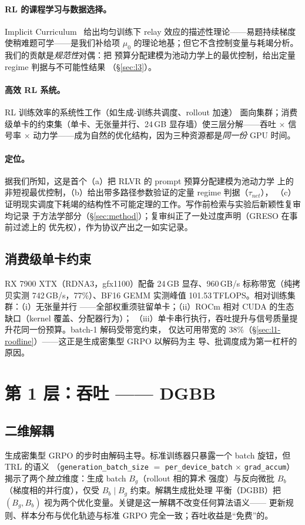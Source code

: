 \documentclass[11pt]{article}
\theoremstyle{definition}
\begin{document}
\paragraph{RL 的课程学习与数据选择。}Implicit Curriculum~\citep{huang2026implicit}
给出均匀训练下 relay 效应的描述性理论——易题持续梯度使稍难题可学——是我们补给项
$\mu_0$ 的理论地基；但它不含控制变量与耗竭分析。我们的贡献是\emph{规范性}对偶：把
预算分配建模为池动力学上的最优控制，给出定量 regime 判据与不可能性结果
（\S\ref{sec:l3}）。

\paragraph{高效 RL 系统。}RL 训练效率的系统性工作（如生成-训练共调度、rollout 加速）
面向集群；消费级单卡的约束集（单卡、无张量并行、24\,GB 显存墙）使三层分解——吞吐
$\times$ 信号率 $\times$ 动力学——成为自然的优化结构，因为三种资源都是\emph{同一份}
GPU 时间。

\paragraph{定位。}据我们所知，这是首个（a）把 RLVR 的 prompt 预算分配建模为池动力学
上的非短视最优控制，（b）给出带多路径参数验证的定量 regime 判据（$\tau_{net}$），
（c）证明现实调度下耗竭的结构性不可能定理的工作。写作前检索与实验后新颖性复审均记录
于方法学部分（\S\ref{sec:method}）；复审纠正了一处过度声明（GRESO 在事前过滤上的
优先权），作为协议产出之一如实记录。

\subsection{消费级单卡约束}\label{sec:bg-hw}
RX 7900 XTX（RDNA3，gfx1100）配备 24\,GB 显存、960\,GB/s 标称带宽（纯拷贝实测
742\,GB/s，77\%）、BF16 GEMM 实测峰值 101.53\,TFLOPS。相对训练集群：（i）无张量并行
——全部权重须驻留单卡；（ii）ROCm 相对 CUDA 的生态缺口（kernel 覆盖、分配器行为）；
（iii）单卡串行执行，吞吐提升与信号质量提升花同一份预算。batch-1 解码受带宽约束，
仅达可用带宽的 38\%（\S\ref{sec:l1-roofline}）——这正是生成密集型 GRPO 以解码为主
导、批调度成为第一杠杆的原因。


\section{第 1 层：吞吐 —— DGBB}\label{sec:l1}

\subsection{二维解耦}\label{sec:l1-decouple}
生成密集型 GRPO 的步时由解码主导。标准训练器只暴露一个 batch 旋钮，但 TRL 的语义
（\texttt{generation\_batch\_size} $=$ \texttt{per\_device\_batch} $\times$
\texttt{grad\_accum}）揭示了两个\emph{独立}维度：生成 batch $B_g$（rollout 相的算术
强度）与反向微批 $B_b$（梯度相的并行度），仅受 $B_b \mid B_g$ 约束。解耦生成批处理
平衡（DGBB）把 $(B_g,B_b)$ 视为两个优化变量。关键是这一解耦不改变任何算法语义——
更新规则、样本分布与优化轨迹与标准 GRPO 完全一致；吞吐收益是“免费”的。
\end{document}
